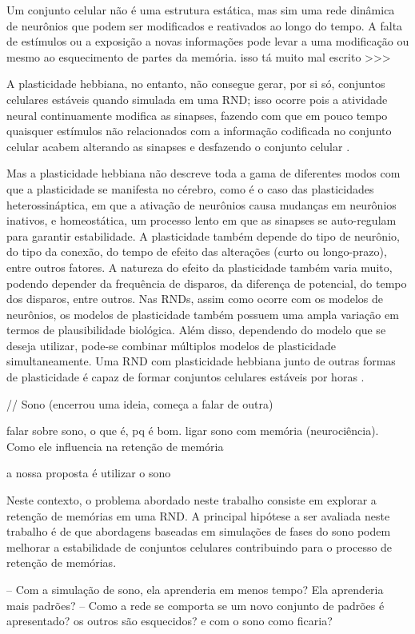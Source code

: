 Um conjunto celular não é uma estrutura estática, mas sim uma rede dinâmica de neurônios que podem ser modificados e reativados ao
longo do tempo. A falta de estímulos ou a exposição a novas informações pode levar a uma modificação ou mesmo ao esquecimento de
partes da memória. isso tá muito mal escrito
>>>

A plasticidade hebbiana, no entanto, não consegue gerar, por si só, conjuntos celulares estáveis quando simulada em uma RND; isso
ocorre pois a atividade neural continuamente modifica as sinapses, fazendo com que em pouco tempo quaisquer estímulos não
relacionados com a informação codificada no conjunto celular acabem alterando as sinapses e desfazendo o conjunto celular
\cite{gerstnerSpiking2002}.

Mas a plasticidade hebbiana não descreve toda a gama de diferentes modos com que a plasticidade se manifesta no cérebro, como é o
caso das  plasticidades heterossináptica, em que a ativação de neurônios causa mudanças em neurônios inativos, e homeostática, um
processo lento em que as sinapses se auto-regulam para garantir estabilidade. A plasticidade também depende do tipo de neurônio,
do tipo da conexão, do tempo de efeito das alterações (curto ou longo-prazo), entre outros fatores. A natureza do efeito da
plasticidade também varia muito, podendo depender da frequência de disparos, da diferença de potencial, do tempo dos disparos,
entre outros. Nas RNDs, assim como ocorre com os modelos de neurônios, os modelos de plasticidade também possuem uma ampla
variação em termos de plausibilidade biológica. Além disso, dependendo do modelo que se deseja utilizar, pode-se combinar
múltiplos modelos de plasticidade simultaneamente. Uma RND com plasticidade hebbiana junto de outras formas de plasticidade é
capaz de formar conjuntos celulares estáveis por horas \cite{zenkeDiverse2015}.

// Sono (encerrou uma ideia, começa a falar de outra)

falar sobre sono, o que é, pq é bom. ligar sono com memória (neurociência). Como ele influencia na retenção de memória

a nossa proposta é utilizar o sono


Neste contexto, o problema abordado neste trabalho consiste em explorar a retenção de memórias em uma RND. A principal hipótese a
ser avaliada neste trabalho é de que abordagens baseadas em simulações de fases do sono podem melhorar a estabilidade de conjuntos
celulares contribuindo para o processo de retenção de memórias.


-- Com a simulação de sono, ela aprenderia em menos tempo? Ela aprenderia mais padrões?
-- Como a rede se comporta se um novo conjunto de padrões é apresentado? os outros são esquecidos? e com o sono como ficaria?





